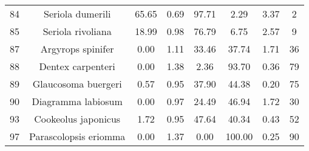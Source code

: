 \documentclass{report}\usepackage[]{graphicx}\usepackage[]{color}
\begin{document}
\begin{table}[ht]
{\begin{tabular}{cccccccc}
   84 & Seriola dumerili & 65.65 & 0.69 & 97.71 & 2.29 & 3.37 & 2 \\ 
   85 & Seriola rivoliana & 18.99 & 0.98 & 76.79 & 6.75 & 2.57 & 9 \\ 
   87 & Argyrops spinifer & 0.00 & 1.11 & 33.46 & 37.74 & 1.71 & 36 \\ 
   88 & Dentex carpenteri & 0.00 & 1.38 & 2.36 & 93.70 & 0.36 & 79 \\ 
   89 & Glaucosoma buergeri & 0.57 & 0.95 & 37.90 & 44.38 & 0.20 & 75 \\ 
   90 & Diagramma labiosum & 0.00 & 0.97 & 24.49 & 46.94 & 1.72 & 30 \\ 
   93 & Cookeolus japonicus & 1.72 & 0.95 & 47.64 & 40.34 & 0.43 & 52 \\ 
   97 & Parascolopsis eriomma & 0.00 & 1.37 & 0.00 & 100.00 & 0.25 & 90 \\ 
   \hline
\end{tabular}
}
\end{table}

\clearpage
\newpage
\end{document}
